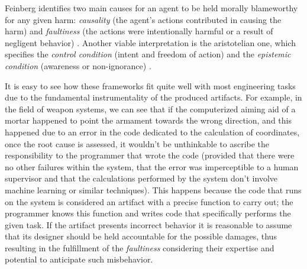 Feinberg identifies two main causes for an agent to be held morally blameworthy for any given harm: \textit{causality} (the agent's actions contributed in causing the harm) and \textit{faultiness} (the actions were intentionally harmful or a result of negligent behavior) \parencite{FEISC}.
Another viable interpretation is the aristotelian one, which specifies the \textit{control condition} (intent and freedom of action) and the \textit{epistemic condition} (awareness or non-ignorance) \parencite{FISRAC}.

It is easy to see how these frameworks fit quite well with most engineering tasks due to the fundamental instrumentality of the produced artifacts.
For example, in the field of weapon systems, we can see that if the computerized aiming aid of a mortar happened to point the armament towards the wrong direction, and this happened due to an error in the code dedicated to the calculation of coordinates, once the root cause is assessed, it wouldn't be unthinkable to ascribe the responsibility to the programmer that wrote the code (provided that there were no other failures within the system, that the error was imperceptible to a human supervisor and that the calculations performed by the system don't involve machine learning or similar techniques).
This happens because the code that runs on the system is considered an artifact with a precise function to carry out; the programmer knows this function and writes code that specifically performs the given task.
If the artifact presents incorrect behavior it is reasonable to assume that its designer should be held accountable for the possible damages, thus resulting in the fulfillment of the \textit{faultiness} considering their expertise and potential to anticipate such misbehavior.

